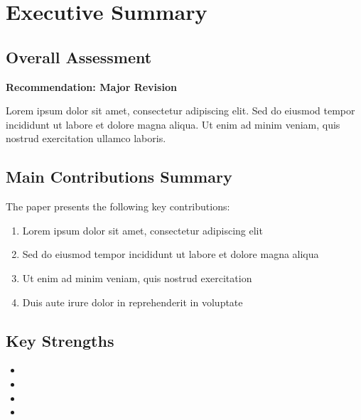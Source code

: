 \section*{Executive Summary}
\label{sec:executive_summary}

\subsection{Overall Assessment}
\textbf{Recommendation: Major Revision}

Lorem ipsum dolor sit amet, consectetur adipiscing elit. Sed do eiusmod tempor incididunt ut labore et dolore magna aliqua. Ut enim ad minim veniam, quis nostrud exercitation ullamco laboris.

\subsection{Main Contributions Summary}
The paper presents the following key contributions:
\begin{enumerate}
    \item Lorem ipsum dolor sit amet, consectetur adipiscing elit
    \item Sed do eiusmod tempor incididunt ut labore et dolore magna aliqua
    \item Ut enim ad minim veniam, quis nostrud exercitation
    \item Duis aute irure dolor in reprehenderit in voluptate
\end{enumerate}

\subsection{Key Strengths}
\begin{itemize}
    \item {}
    \item {}
    \item {}
    \item {}
\end{itemize}


